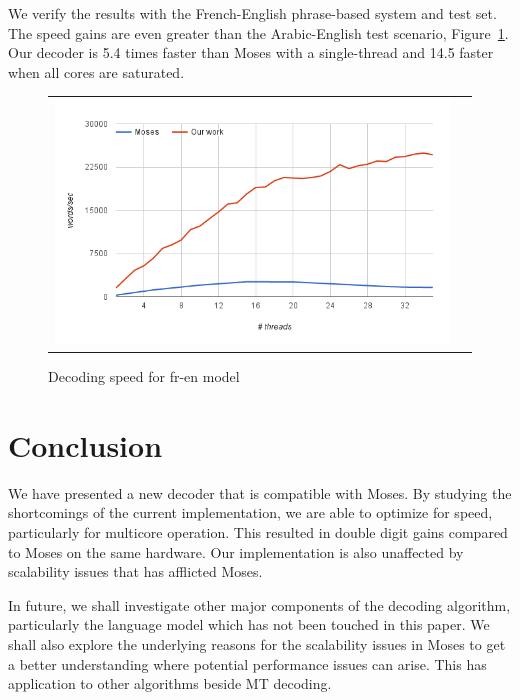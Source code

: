 \documentclass[11pt]{article}
\begin{document}
We verify the results with the French-English phrase-based system and test set. The speed gains are even greater than the Arabic-English test scenario, Figure~\ref{fig:fr-en-speed}. Our decoder is 5.4 times faster than Moses with a single-thread and 14.5 faster when all cores are saturated.
\begin{figure}[h]
\centering
\begin{tabular}{cc}
{\includegraphics[scale=0.4]{fr-en-speed.png}} 
\end{tabular}
\caption{Decoding speed for fr-en model}
\label{fig:fr-en-speed}
\end{figure} 

\section{Conclusion}

We have presented a new decoder that is compatible with Moses. By studying the shortcomings of the current implementation, we are able to optimize for speed, particularly for multicore operation. This resulted in double digit gains compared to Moses on the same hardware. Our implementation is also unaffected by scalability issues that has afflicted Moses. %

In future, we shall investigate other major components of the decoding algorithm, particularly the language model which has not been touched in this paper. We shall also explore the underlying reasons for the scalability issues in Moses to get a better understanding where potential performance issues can arise. This has application to other algorithms beside MT decoding. 

% 



\end{document}
